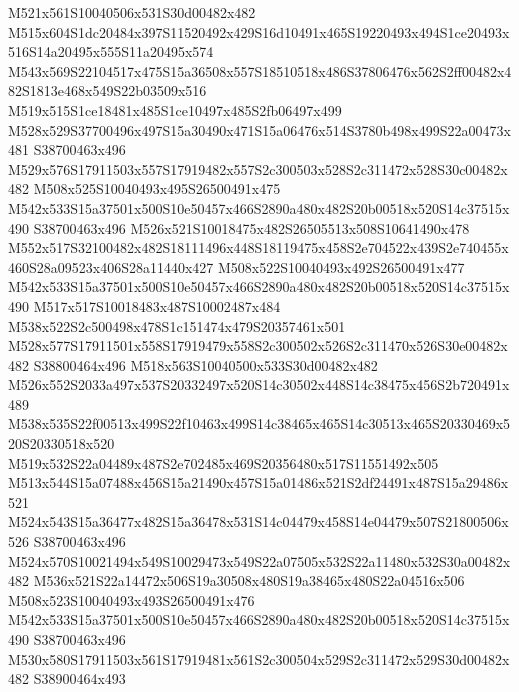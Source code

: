 \documentclass{article}
\begin{document}
\begin{multicols}{2}
M521x561S10040506x531S30d00482x482 M515x604S1dc20484x397S11520492x429S16d10491x465S19220493x494S1ce20493x516S14a20495x555S11a20495x574 M543x569S22104517x475S15a36508x557S18510518x486S37806476x562S2ff00482x482S1813e468x549S22b03509x516 M519x515S1ce18481x485S1ce10497x485S2fb06497x499 M528x529S37700496x497S15a30490x471S15a06476x514S3780b498x499S22a00473x481 S38700463x496 M529x576S17911503x557S17919482x557S2c300503x528S2c311472x528S30c00482x482 M508x525S10040493x495S26500491x475 M542x533S15a37501x500S10e50457x466S2890a480x482S20b00518x520S14c37515x490 S38700463x496 M526x521S10018475x482S26505513x508S10641490x478 M552x517S32100482x482S18111496x448S18119475x458S2e704522x439S2e740455x460S28a09523x406S28a11440x427 M508x522S10040493x492S26500491x477 M542x533S15a37501x500S10e50457x466S2890a480x482S20b00518x520S14c37515x490 M517x517S10018483x487S10002487x484 M538x522S2c500498x478S1c151474x479S20357461x501 M528x577S17911501x558S17919479x558S2c300502x526S2c311470x526S30e00482x482 S38800464x496 M518x563S10040500x533S30d00482x482 M526x552S2033a497x537S20332497x520S14c30502x448S14c38475x456S2b720491x489 M538x535S22f00513x499S22f10463x499S14c38465x465S14c30513x465S20330469x520S20330518x520 M519x532S22a04489x487S2e702485x469S20356480x517S11551492x505 M513x544S15a07488x456S15a21490x457S15a01486x521S2df24491x487S15a29486x521 M524x543S15a36477x482S15a36478x531S14c04479x458S14e04479x507S21800506x526 S38700463x496 M524x570S10021494x549S10029473x549S22a07505x532S22a11480x532S30a00482x482 M536x521S22a14472x506S19a30508x480S19a38465x480S22a04516x506 M508x523S10040493x493S26500491x476 M542x533S15a37501x500S10e50457x466S2890a480x482S20b00518x520S14c37515x490 S38700463x496 M530x580S17911503x561S17919481x561S2c300504x529S2c311472x529S30d00482x482 S38900464x493






\end{multicols}
\end{document}
